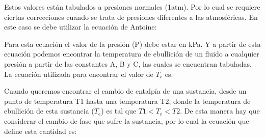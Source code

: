Estos valores están tabulados a presiones normales (1atm). Por lo cual se requiere ciertas correcciones cuando se trata de presiones diferentes a las atmosféricas. 
En este caso se debe utilizar la ecuación de Antoine:


Para esta ecuación el valor de la presión (P) debe estar en kPa. Y a partir de esta ecuación podemos encontrar la temperatura de ebullición de un fluido a cualquier presión a partir de las constantes A, B y C, las cuales se encuentran tabuladas.
La ecuación utilizada para encontrar el valor de $T_e$ es:


Cuando queremos encontrar el cambio de entalpía de una sustancia, desde un punto de temperatura T1 hasta una temperatura T2, donde la temperatura de ebullición de esta sustancia ($T_e$) es tal que $T1<T_e<T2$.
De esta manera hay que considerar el cambio de fase que sufre la sustancia, por lo cual la ecuación que define esta cantidad es:

